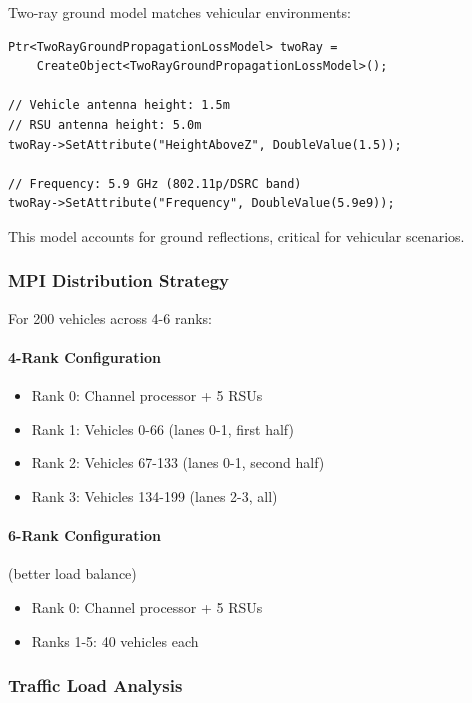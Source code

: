 Two-ray ground model matches vehicular environments:

\begin{lstlisting}[style=cpp, caption={V2X propagation configuration}]
Ptr<TwoRayGroundPropagationLossModel> twoRay = 
    CreateObject<TwoRayGroundPropagationLossModel>();

// Vehicle antenna height: 1.5m
// RSU antenna height: 5.0m
twoRay->SetAttribute("HeightAboveZ", DoubleValue(1.5));

// Frequency: 5.9 GHz (802.11p/DSRC band)
twoRay->SetAttribute("Frequency", DoubleValue(5.9e9));
\end{lstlisting}

This model accounts for ground reflections, critical for vehicular scenarios.

\subsubsection{MPI Distribution Strategy}

For 200 vehicles across 4-6 ranks:

\paragraph{4-Rank Configuration}
\begin{itemize}
    \item Rank 0: Channel processor + 5 RSUs
    \item Rank 1: Vehicles 0-66 (lanes 0-1, first half)
    \item Rank 2: Vehicles 67-133 (lanes 0-1, second half)
    \item Rank 3: Vehicles 134-199 (lanes 2-3, all)
\end{itemize}

\paragraph{6-Rank Configuration} (better load balance)
\begin{itemize}
    \item Rank 0: Channel processor + 5 RSUs
    \item Ranks 1-5: 40 vehicles each
\end{itemize}

\subsubsection{Traffic Load Analysis}

